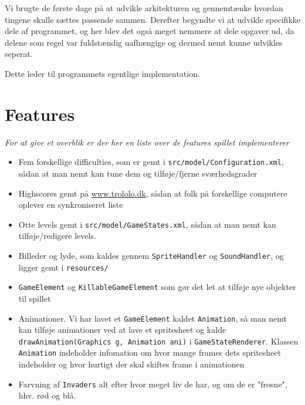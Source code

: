 \documentclass[titlepage,danish]{article}
\newcommand{\code}[1]{\texttt{#1}}
\begin{document}
Vi brugte de første dage på at udvikle arkitekturen og gennemtænke hvordan tingene skulle
sættes passende sammen. Derefter begyndte vi at udvikle specifikke dele af programmet, og her blev
det også meget nemmere at dele opgaver ud, da delene som regel var fuldstændig uafhængige og dermed
nemt kunne udvikles seperat.

Dette leder til programmets egentlige implementation.

\section{Features}
\emph{For at give et overblik er der her en liste over de features spillet implementerer}

\begin{itemize}
\item Fem forskellige difficulties, som er gemt i \code{src/model/Configuration.xml}, sådan at man
  nemt kan tune dem og tilføje/fjerne sværhedsgrader
\item Highscores gemt på \url{www.trololo.dk}, sådan at folk på forskellige computere oplever en synkroniseret liste
\item Otte levels gemt i \code{src/model/GameStates.xml}, sådan at man nemt kan tilføje/redigere
  levels.
\item Billeder og lyde, som kaldes gennem \code{SpriteHandler} og \code{SoundHandler}, og ligger gemt i
  \code{resources/}
\item \code{GameElement} og \code{KillableGameElement} som gør det let at tilføje nye objekter til
  spillet
\item Animationer. Vi har lavet et \code{GameElement} kaldet \code{Animation}, så man nemt kan
  tilføje animationer ved at lave et spritesheet og kalde \code{drawAnimation(Graphics g, Animation
    ani)} i \code{GameStateRenderer}. Klassen \code{Animation} indeholder infomation om hvor mange
  frames dets spritesheet indeholder og hvor hurtigt der skal skiftes frame i animationen
\item Farvning af \code{Invaders} alt efter hvor meget liv de har, og om de er "frosne", hhv. rød og blå.
\end{itemize}
\end{document}
